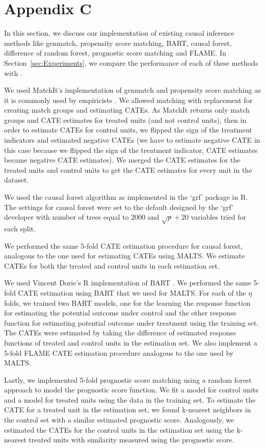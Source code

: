 \section*{Appendix C}
In this section, we discuss our implementation of existing causal inference methods like genmatch, propensity score matching, BART, causal forest, difference of random forest,  prognostic score matching and FLAME. In Section~\ref{sec:Experiments}, we compare the performance of each of these methods with \malts.

We used MatchIt's implementation of genmatch and propensity score matching as it is commonly used by empiricists \citep{matchit2011}. We allowed matching with replacement for creating match groups and estimating CATEs. As MatchIt returns only match groups and CATE estimates for treated units (and not control units), then in order to estimate CATEs for control units, we flipped the sign of the treatment indicators and estimated negative CATEs (we have to estimate negative CATE in this case because we flipped the sign of the treatment indicator, CATE estimates became negative CATE estimates). We merged the CATE estimates for the treated units and control units to get the CATE estimates for every unit in the dataset.

We used the causal forest algorithm as implemented in the `grf' package in R. The settings for causal forest were set to the default designed by the `grf' developer with number of trees equal to $2000$ and $\sqrt{p}+20$ variables tried for each split. 

We performed the same 5-fold CATE estimation procedure for causal forest, analogous to the one used for estimating CATEs using MALTS. We estimate CATEs for both the treated and control units in each estimation set. 

We used Vincent Dorie's R implementation of BART \citep{dbart}. We performed the same 5-fold CATE estimation using BART that we used for MALTS. For each of the $\eta$ folds, we trained two BART models, one for the learning the response function for estimating the potential outcome under control and the other response function for estimating potential outcome under treatment using the training set. The CATEs were estimated by taking the difference of estimated response functions of treated and control units in the estimation set. We also implement a 5-fold FLAME CATE estimation procedure analogous to the one used by MALTS.

Lastly, we implemented 5-fold prognostic score matching using a random forest approach to model the prognostic score function. We fit a model for control units and a model for treated units using the data in the training set. To estimate the CATE for a treated unit in the estimation set, we found k-nearest neighbors in the control set with a similar estimated prognostic score. Analogously, we estimated the CATEs for the control units in the estimation set using the k-nearest treated units with similarity measured using the prognostic score.

